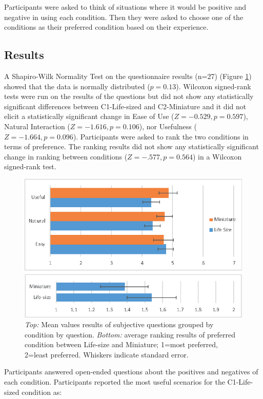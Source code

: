 Participants were asked to think of situations where it would be positive and negative in using each condition. Then they were asked to choose one of the conditions as their preferred condition based on their experience.

\subsection{Results}

A Shapiro-Wilk Normality Test on the questionnaire results (n=27) (Figure \ref{fig:continuum:results}) showed that the data is normally distributed ($p=0.13$). Wilcoxon signed-rank tests were run on the results of the questions but did not show any statistically significant differences between C1-Life-sized and C2-Miniature and it did not elicit a statistically significant change in Ease of Use ($Z=-0.529, p=0.597$), Natural Interaction ($Z=-1.616, p=0.106$), nor Usefulness ($Z=-1.664, p=0.096$). Participants were asked to rank the two conditions in terms of preference. The ranking results did not show any statistically significant change in ranking between conditions ($Z=-.577, p=0.564$) in a Wilcoxon signed-rank test.

\begin{figure}[ht]
    \centering
    \includegraphics[width=0.8\linewidth]{images/42-placement-ismar17/images-09.eps}
    \caption{\textit{Top:} Mean values results of subjective questions grouped by condition by question. \textit{Bottom:} average ranking results of preferred condition between Life-size and Miniature; 1=most preferred, 2=least preferred. Whiskers indicate standard error.}
    \label{fig:continuum:results}
\end{figure}

Participants answered open-ended questions about the positives and negatives of each condition. Participants reported the most useful scenarios for the C1-Life-sized condition as:

